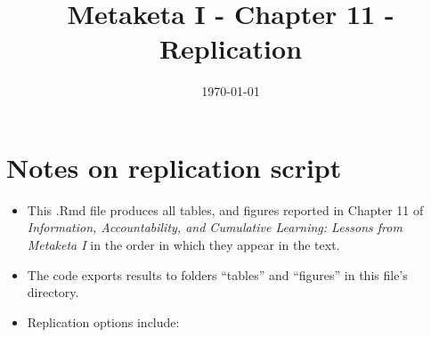 \documentclass[]{article}
\title{Metaketa I - Chapter 11 - Replication}
\author{}
\date{\today}
\begin{document}
\maketitle

{
\setcounter{tocdepth}{3}
\tableofcontents
}
\clearpage

\section{Notes on replication script}\label{notes-on-replication-script}

\begin{itemize}
\item
  This .Rmd file produces all tables, and figures reported in Chapter 11
  of \emph{Information, Accountability, and Cumulative Learning: Lessons
  from Metaketa I} in the order in which they appear in the text.
\item
  The code exports results to folders ``tables'' and ``figures'' in this
  file's directory.
\item
  Replication options include:


\end{itemize}
\end{document}
